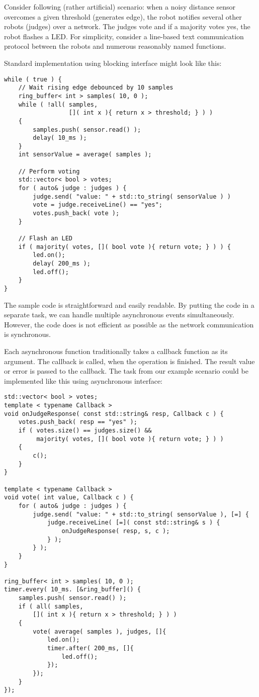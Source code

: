 Consider following (rather artificial) scenario: when a noisy distance sensor
overcomes a given threshold (generates edge), the robot notifies several other
robots (judges) over a network. The judges vote and if a majority votes yes, the
robot flashes a LED. For simplicity, consider a line-based text communication
protocol between the robots and numerous reasonably named functions.

Standard implementation using blocking interface might look like this:
\begin{verbatim}
while ( true ) {
    // Wait rising edge debounced by 10 samples
    ring_buffer< int > samples( 10, 0 );
    while ( !all( samples,
                  []( int x ){ return x > threshold; } ) )
    {
        samples.push( sensor.read() );
        delay( 10_ms );
    }
    int sensorValue = average( samples );

    // Perform voting
    std::vector< bool > votes;
    for ( auto& judge : judges ) {
        judge.send( "value: " + std::to_string( sensorValue ) )
        vote = judge.receiveLine() == "yes";
        votes.push_back( vote );
    }

    // Flash an LED
    if ( majority( votes, []( bool vote ){ return vote; } ) ) {
        led.on();
        delay( 200_ms );
        led.off();
    }
}
\end{verbatim}

The sample code is straightforward and easily readable. By putting the code in a
separate task, we can handle multiple asynchronous events simultaneously.
However, the code does is not efficient as possible as the network communication
is synchronous.

Each asynchronous function traditionally takes a callback function as its
argument. The callback is called, when the operation is finished. The result
value or error is passed to the callback. The task from our example scenario
could be implemented like this using asynchronous interface:

\begin{verbatim}
std::vector< bool > votes;
template < typename Callback >
void onJudgeResponse( const std::string& resp, Callback c ) {
    votes.push_back( resp == "yes" );
    if ( votes.size() == judges.size() &&
         majority( votes, []( bool vote ){ return vote; } ) )
    {
        c();
    }
}

template < typename Callback >
void vote( int value, Callback c ) {
    for ( auto& judge : judges ) {
        judge.send( "value: " + std::to_string( sensorValue ), [=] {
            judge.receiveLine( [=]( const std::string& s ) {
                onJudgeResponse( resp, s, c );
            } );
        } );
    }
}

ring_buffer< int > samples( 10, 0 );
timer.every( 10_ms. [&ring_buffer]() {
    samples.push( sensor.read() );
    if ( all( samples,
        []( int x ){ return x > threshold; } ) )
    {
        vote( average( samples ), judges, []{
            led.on();
            timer.after( 200_ms, []{
                led.off();
            });
        });
    }
});
\end{verbatim}

